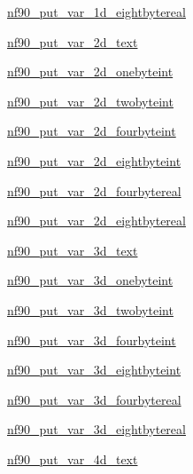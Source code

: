 \begin{DoxyCompactItemize}
\item 
\hyperlink{interfacenf90__put__var_a995fd6eab567c3b5a8b6e3e4b40e4995}{nf90\+\_\+put\+\_\+var\+\_\+1d\+\_\+eightbytereal}
\item 
\hyperlink{interfacenf90__put__var_aceeff223e46cdd1d9058bb1eaf823d2e}{nf90\+\_\+put\+\_\+var\+\_\+2d\+\_\+text}
\item 
\hyperlink{interfacenf90__put__var_ab264c8c13b0ad6ac0ea9fcb84e74d31c}{nf90\+\_\+put\+\_\+var\+\_\+2d\+\_\+onebyteint}
\item 
\hyperlink{interfacenf90__put__var_a414365efe380f3747144df2ee47fe079}{nf90\+\_\+put\+\_\+var\+\_\+2d\+\_\+twobyteint}
\item 
\hyperlink{interfacenf90__put__var_ab5f8c885826ef47e20e3998b7ad2cf99}{nf90\+\_\+put\+\_\+var\+\_\+2d\+\_\+fourbyteint}
\item 
\hyperlink{interfacenf90__put__var_aa173ec5740ea9a8ee37456c60384ce2b}{nf90\+\_\+put\+\_\+var\+\_\+2d\+\_\+eightbyteint}
\item 
\hyperlink{interfacenf90__put__var_a8fb6742967ef831e8bb3e19b8731092d}{nf90\+\_\+put\+\_\+var\+\_\+2d\+\_\+fourbytereal}
\item 
\hyperlink{interfacenf90__put__var_a762786cd9f8881d9d265e9746e3213b8}{nf90\+\_\+put\+\_\+var\+\_\+2d\+\_\+eightbytereal}
\item 
\hyperlink{interfacenf90__put__var_ac0d86cb326ba8e05b4fca57d0b2bfe3c}{nf90\+\_\+put\+\_\+var\+\_\+3d\+\_\+text}
\item 
\hyperlink{interfacenf90__put__var_a4e8063eb84b5b82830b5662e202f04cb}{nf90\+\_\+put\+\_\+var\+\_\+3d\+\_\+onebyteint}
\item 
\hyperlink{interfacenf90__put__var_a7d706b702bee1918aef6b56d06d2ae18}{nf90\+\_\+put\+\_\+var\+\_\+3d\+\_\+twobyteint}
\item 
\hyperlink{interfacenf90__put__var_ac2cb97d9df8d1632264dca99967a170c}{nf90\+\_\+put\+\_\+var\+\_\+3d\+\_\+fourbyteint}
\item 
\hyperlink{interfacenf90__put__var_add4ed4115535c35667906a0e7763ba4f}{nf90\+\_\+put\+\_\+var\+\_\+3d\+\_\+eightbyteint}
\item 
\hyperlink{interfacenf90__put__var_a23b9090072e82122a76345e5409c92e6}{nf90\+\_\+put\+\_\+var\+\_\+3d\+\_\+fourbytereal}
\item 
\hyperlink{interfacenf90__put__var_aceeb9a2486a3834869060fd8d0273f84}{nf90\+\_\+put\+\_\+var\+\_\+3d\+\_\+eightbytereal}
\item 
\hyperlink{interfacenf90__put__var_ae5e6b2bec46479663e4defca34215df1}{nf90\+\_\+put\+\_\+var\+\_\+4d\+\_\+text}

\end{DoxyCompactItemize}
